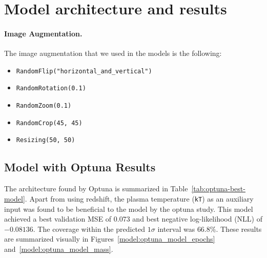 \section{Model architecture and results} \label{sec:models}


\paragraph{Image Augmentation.}
The image augmentation  that we used in the models is the following:

\begin{itemize}
    \item \texttt{RandomFlip("horizontal\_and\_vertical")}
    \item \texttt{RandomRotation(0.1)}
    \item \texttt{RandomZoom(0.1)}
    \item \texttt{RandomCrop(45, 45)}
    \item \texttt{Resizing(50, 50)}
\end{itemize}


\subsection{Model with Optuna Results}

The architecture found by Optuna is summarized in 
Table~\ref{tab:optuna-best-model}. Apart from using redshift, 
the plasma temperature (\texttt{kT}) as an auxiliary input was found 
to be beneficial to the model by the optuna study. This model achieved 
a best validation MSE of $0.073$ 
and best negative log-likelihood (NLL) of $-0.08136$. The coverage 
within the predicted $1\sigma$ interval was $66.8\%$. These results 
are summarized visually in Figures~\ref{model:optuna_model_epochs} 
and~\ref{model:optuna_model_mass}.




